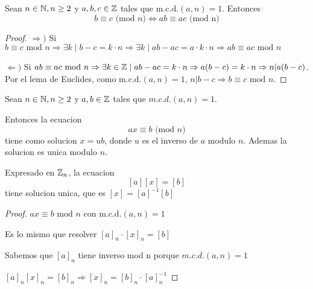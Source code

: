 \begin{lemma}
	Sean \(n \in \mathbb{N}, n \geq  2 \) y \(a,b,c \in  \mathbb{Z}\) tales que \(\mathrm{m.c.d.}(a,n) = 1 \). Entonces
	\[
		b \equiv c \text{ (mod } n ) \iff ab \equiv ac \text{ (mod n)}
	\]
\end{lemma}
\begin{proof}
	\(\Rightarrow ) \) Si \(b \equiv c \text{ mod } n  \Rightarrow \exists k \mid b - c= k \cdot n \Rightarrow \exists k \mid ab - ac = a \cdot k \cdot n \Rightarrow ab \equiv ac \text{ mod } n \)
	
	\(\Leftarrow ) \) Si \(ab \equiv ac \text{ mod } n \Rightarrow \exists  k \in \mathbb{Z} \mid ab - ac = k \cdot n \Rightarrow a(b-c) = k \cdot n \Rightarrow n|a(b-c)\). Por el lema de Euclides, como \(\mathrm{m.c.d.}(a,n) = 1  \), \(n|b-c \Rightarrow b \equiv c \text{ mod }  n \).
\end{proof}

\begin{proposition}
	Sean \(n \in \mathbb{N}, n \geq 2 \) y \(a,b \in \mathbb{Z} \) tales que \(m.c.d.(a,n) = 1 \).
	
	Entonces la ecuacion
	\[
		ax \equiv b \text{ (mod } n )
	\]
	tiene como solucion \(x = ub \), donde \(u \) es el inverso de \(a \) modulo \(n \). Ademas la solucion es unica modulo \(n \).
	
	Expresado en \(\mathbb{Z}_n \), la ecuacion
	\[
		[a][x] = [b ]
	\]
	tiene solucion unica, que es \([x] = [a]^{-1} [b]\)
\end{proposition}

\begin{proof}
	\(ax \equiv b \text{ mod } n \) con \(\mathrm{m.c.d.}(a,n) = 1  \)
	
	Es lo mismo que resolver \([a]_n \cdot [x]_n = [b]\)
	
	Sabemos que \([a]_n \) tiene inverso mod n porque \(m.c.d.(a,n) = 1 \)
	
	\([a]_n [x]_n = [b]_n \Rightarrow [x]_n = [b]_n \cdot [a]^{-1}_n\)
\end{proof}

